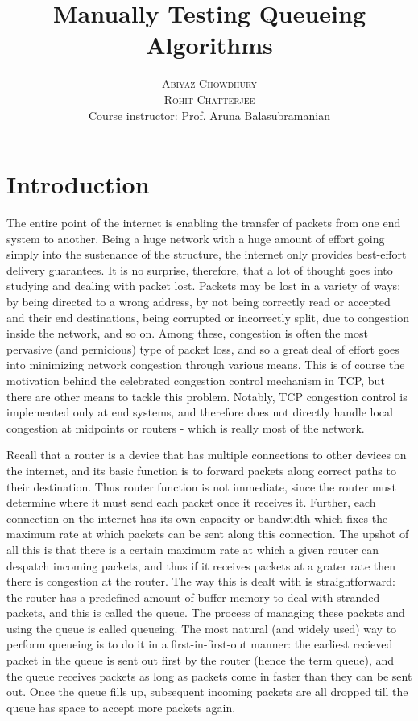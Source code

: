 \documentclass[paper=letter, fontsize=13pt]{article}
\title{\vspace{-15mm}\fontsize{24pt}{10pt}\selectfont\textbf{Manually Testing Queueing Algorithms}} %
\author{
\large
{\textsc{Abiyaz Chowdhury }}\\[2mm]
{\textsc{Rohit Chatterjee}}\\[2mm]
\normalsize Course instructor: Prof. Aruna Balasubramanian \\[2mm] %
}
\date{}
\begin{document}
\maketitle %
\thispagestyle{fancy} %


\section{Introduction}
The entire point of the internet is enabling the transfer of packets from one end system to another. Being a huge network with a huge amount of effort going simply into the sustenance of the structure, the internet only provides best-effort delivery guarantees. It is no surprise, therefore, that a lot of thought goes into studying and dealing with packet lost. Packets may be lost in a variety of ways: by being directed to a wrong address, by not being correctly read or accepted and their end destinations, being corrupted or incorrectly split, due to congestion inside the network, and so on. Among these, congestion is often the most pervasive (and pernicious) type of packet loss, and so a great deal of effort goes into minimizing network congestion through various means. This is of course the motivation behind the celebrated congestion control mechanism in TCP, but there are other means to tackle this problem. Notably, TCP congestion control is implemented only at end systems, and therefore does not directly handle local congestion at midpoints or routers - which is really most of the network.

Recall that a router is a device that has multiple connections to other devices on the internet, and its basic function is to forward packets along correct paths to their destination. Thus router function is not immediate, since the router must determine where it must send each packet once it receives it. Further, each connection on the internet has its own capacity or bandwidth which fixes the maximum rate at which packets can be sent along this connection. The upshot of all this is that there is a certain maximum rate at which a given router can despatch incoming packets, and thus if it receives packets at a grater rate then there is congestion at the router. The way this is dealt with is straightforward: the router has a predefined amount of buffer memory to deal with stranded packets, and this is called the queue. The process of managing these packets and using the queue is called queueing. The most natural (and widely used) way to perform queueing is to do it in a first-in-first-out manner: the earliest recieved packet in the  queue is sent out first by the router (hence the term queue), and the queue receives packets as long as packets come in faster than they can be sent out. Once the queue fills up, subsequent incoming packets are all dropped till the queue has space to accept more packets again.
\end{document}
